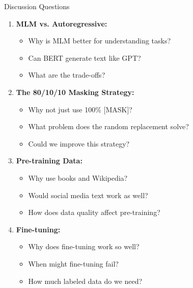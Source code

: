 \documentclass[aspectratio=169]{beamer}
\begin{document}
\begin{frame}[shrink=10]{Discussion Questions 💭}
\begin{enumerate}\setlength{\itemsep}{0pt}
    \item \textbf{MLM vs. Autoregressive:}
    \begin{itemize}\setlength{\itemsep}{0pt}
        \item Why is MLM better for understanding tasks?
        \item Can BERT generate text like GPT?
        \item What are the trade-offs?
    \end{itemize}

    \vspace{0.5em}

    \item \textbf{The 80/10/10 Masking Strategy:}
    \begin{itemize}\setlength{\itemsep}{0pt}
        \item Why not just use 100\% [MASK]?
        \item What problem does the random replacement solve?
        \item Could we improve this strategy?
    \end{itemize}

    \vspace{0.5em}

    \item \textbf{Pre-training Data:}
    \begin{itemize}\setlength{\itemsep}{0pt}
        \item Why use books and Wikipedia?
        \item Would social media text work as well?
        \item How does data quality affect pre-training?
    \end{itemize}

    \vspace{0.5em}

    \item \textbf{Fine-tuning:}
    \begin{itemize}\setlength{\itemsep}{0pt}
        \item Why does fine-tuning work so well?
        \item When might fine-tuning fail?
        \item How much labeled data do we need?
    \end{itemize}
\end{enumerate}
\end{frame}
\end{document}
